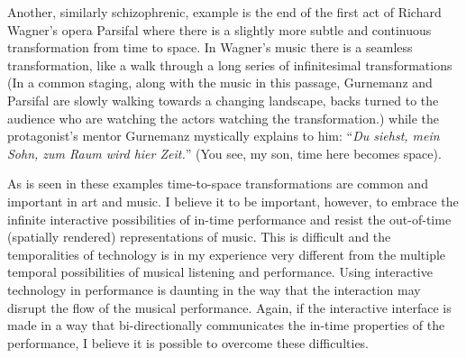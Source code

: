 \documentclass{article}
\begin{document}
Another, similarly schizophrenic, example is the end of the first act of Richard Wagner's opera Parsifal where there is a slightly more subtle and continuous transformation from time to space. In Wagner's music there is a seamless transformation, like a walk through a long series of infinitesimal transformations (In a common staging, along with the music in this passage, Gurnemanz and Parsifal are slowly walking towards a changing landscape, backs turned to the audience who are watching the actors watching the transformation.) while the protagonist's mentor Gurnemanz mystically explains to him: ``\emph{Du siehst, mein Sohn, zum Raum wird hier Zeit.}'' (You see, my son, time here becomes space). 

As is seen in these examples time-to-space transformations are common and important in art and music. I believe it to be important, however, to embrace the infinite interactive possibilities of in-time performance and resist the out-of-time (spatially rendered) representations of music. This is difficult and the temporalities of technology is in my experience very different from the multiple temporal possibilities of musical listening and performance. Using interactive technology in performance is daunting in the way that the interaction may disrupt the flow of the musical performance. Again, if the interactive interface is made in a way that bi-directionally communicates the in-time properties of the performance, I believe it is possible to overcome these difficulties.



\end{document}
